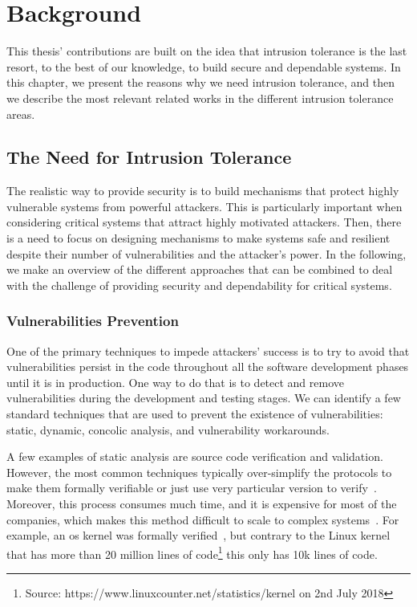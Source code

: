 \chapter{Background}
\label{chap:related_work}

This thesis' contributions are built on the idea that intrusion tolerance is the last resort, to the best of our knowledge, to build secure and dependable systems.
In this chapter, we present the reasons why we need intrusion tolerance, and then we describe the most relevant related works in the different intrusion tolerance areas.


\section{The Need for Intrusion Tolerance}
The realistic way to provide security is to build mechanisms that protect highly vulnerable systems from powerful attackers.
This is particularly important when considering critical systems that attract highly motivated attackers. 
Then, there is a need to focus on designing mechanisms to make systems safe and resilient despite their number of vulnerabilities and the attacker's power.
In the following, we make an overview of the different approaches that can be combined to deal with the challenge of providing security and dependability for critical systems.

\subsection{Vulnerabilities Prevention}
One of the primary techniques to impede attackers' success is to try to avoid that vulnerabilities persist in the code throughout all the software development phases until it is in production. 
One way to do that is to detect and remove vulnerabilities during the development and testing stages.
We can identify a few standard techniques that are used to prevent the existence of vulnerabilities: static, dynamic, concolic analysis, and vulnerability workarounds.

A few examples of static analysis are source code verification and validation. 
However, the most common techniques typically over-simplify the protocols to make them formally verifiable or just use very particular version to verify~\cite{Klein:2009,Nelson:2017}. 
Moreover, this process consumes much time, and it is expensive for most of the companies, which makes this method difficult to scale to complex systems~\cite{Giuffrida:2013}.
For example, an \gls{os} kernel was formally verified~\cite{Klein:2009}, but contrary to the Linux kernel that has more than 20 million lines of code\footnote{Source: https://www.linuxcounter.net/statistics/kernel on 2nd July 2018} this only has 10k lines of code.

